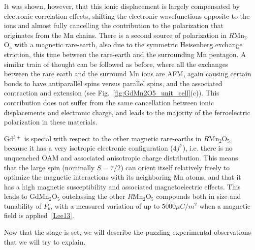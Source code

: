 It was shown, however, that this ionic displacement is largely compensated by electronic correlation effects, shifting the electronic wavefunctions opposite to the ions and almost fully cancelling the contribution to the polarization that originates from the Mn chains.
There is a second source of polarization in $R$Mn$_2$O$_5$ with a magnetic rare-earth, also due to the symmetric Heisenberg exchange striction, this time between the rare-earth and the surrounding Mn pentagon.
A similar train of thought can be followed as before, where all the exchanges between the rare earth and the surround Mn ions are AFM, again causing certain bonds to have antiparallel spins versus parallel spins, and the associated contraction and extension (see Fig.~\ref{fig:GdMn2O5_unit_cell}(c)).
This contribution does not suffer from the same cancellation between ionic displacements and electronic charge, and leads to the majority of the ferroelectric polarization in these materials.

Gd$^{3+}$ is special with respect to the other magnetic rare-earths in $R$Mn$_2$O$_5$, because it has a very isotropic electronic configuration (4$f^7$), i.e. there is no unquenched OAM and associated anisotropic charge distribution. This means that the large spin (nominally $S=7/2$) can orient itself relatively freely to optimize the magnetic interactions with its neighboring Mn atoms, and that it has a high magnetic susceptibility and associated magnetoelectric effects.
This leads to GdMn$_2$O$_5$ outclassing the other $R$Mn$_2$O$_5$ compounds both in size and tunability of $P_b$, with a measured variation of up to $5000 \mu C/m^2$ when a magnetic field is applied~\ref{Lee13}. 

Now that the stage is set, we will describe the puzzling experimental observations that we will try to explain.

